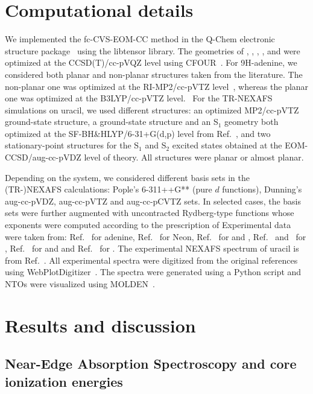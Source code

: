 \documentclass[journal=jctcce,manuscript=article]{achemso}
\begin{document}
\section{Computational details}
We implemented the fc-CVS-EOM-CC method in the Q-Chem electronic structure package~\cite{qchem_feature,Qchem_MP_paper} using
the libtensor library\cite{libtensor_paper}.
The geometries of , , , ,  and  were optimized at the CCSD(T)/cc-pVQZ level using CFOUR~\cite{stanton2010cfour}. For 9H-adenine, we considered 
both planar and non-planar structures taken from the literature. The non-planar one was optimized at the RI-MP2/cc-pVTZ level~\cite{SarahMCD2018}, whereas the planar one was optimized at the B3LYP/cc-pVTZ level.~\cite{Santoro2014}
For the TR-NEXAFS simulations on uracil, we used different structures: an optimized MP2/cc-pVTZ ground-state structure, a ground-state structure and an S$_1$ geometry both optimized at the SF-BH\&HLYP/6-31+G(d,p) level from Ref.~, and two stationary-point 
structures for the S$_1$ and S$_2$ excited states
obtained at the EOM-CCSD/aug-cc-pVDZ level of theory. 
All structures were planar or almost planar.

Depending on the system, we considered different basis sets  in the (TR-)NEXAFS calculations:  Pople's 6-311++G** (pure $d$ functions), Dunning's aug-cc-pVDZ, aug-cc-pVTZ and aug-cc-pCVTZ sets. In selected cases, the basis sets were further augmented with uncontracted Rydberg-type functions whose exponents were computed according to the prescription of \citeauthor{Rydberg_basis}\cite{Rydberg_basis} 
Experimental data were taken from:  Ref.~
for adenine, Ref.~ for Neon,
Ref.~ for  and ,
Ref.~ and~ for ,
Ref.~ for  and  and Ref.~ for .
The experimental NEXAFS spectrum of uracil is from Ref.~.
All experimental spectra were digitized from the 
original references using WebPlotDigitizer~\cite{WPD}. 
The spectra were generated using a Python script and NTOs were visualized using MOLDEN~\cite{molden}.

\section{Results and discussion}
\subsection{Near-Edge Absorption Spectroscopy and core ionization energies}
\end{document}
